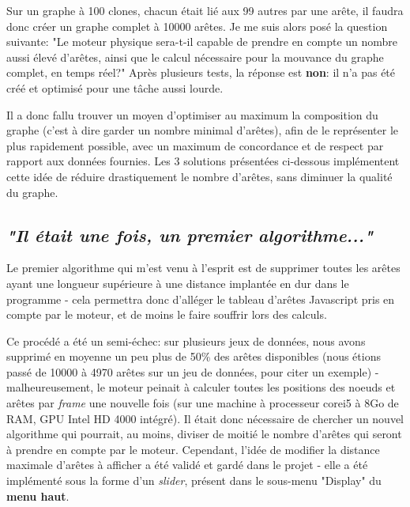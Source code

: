 \documentclass[pdftex,12pt,a4paper]{report}
\begin{document}
\begin{spacing}{1.2}
Sur un graphe à 100 clones, chacun était lié aux 99 autres par une arête, il faudra donc créer un graphe complet à 10000 arêtes. 
Je me suis alors posé la question suivante: "Le moteur physique sera-t-il capable de prendre en compte un nombre aussi élevé d'arêtes, ainsi que le calcul nécessaire pour la mouvance du graphe complet, en temps réel?"
Après plusieurs tests, la réponse est \textbf{non}: il n'a pas été créé et optimisé pour une tâche aussi lourde.

Il a donc fallu trouver un moyen d'optimiser au maximum la composition du graphe (c'est à dire garder un nombre minimal d'arêtes), afin de le représenter le plus rapidement possible, avec un maximum de concordance et de respect par rapport aux données fournies.
Les 3 solutions présentées ci-dessous implémentent cette idée de réduire drastiquement le nombre d'arêtes, sans diminuer la qualité du graphe.

\subsection{\textit{"Il était une fois, un premier algorithme..."}}
Le premier algorithme qui m'est venu à l'esprit est de supprimer toutes les arêtes ayant une longueur supérieure à une distance implantée en dur dans le programme - cela permettra donc d'alléger le tableau d'arêtes Javascript pris en compte par le moteur, et de moins le faire souffrir lors des calculs.

Ce procédé a été un semi-échec: sur plusieurs jeux de données, nous avons supprimé en moyenne un peu plus de 50\% des arêtes disponibles (nous étions passé de 10000 à 4970 arêtes sur un jeu de données, pour citer un exemple) - malheureusement, le moteur peinait à calculer toutes les positions des noeuds et arêtes par \textit{frame} une nouvelle fois (sur une machine à processeur corei5 à 8Go de RAM, GPU Intel HD 4000 intégré).
Il était donc nécessaire de chercher un nouvel algorithme qui pourrait, au moins, diviser de moitié le nombre d'arêtes qui seront à prendre en compte par le moteur. Cependant, l'idée de modifier la distance maximale d'arêtes à afficher a été validé et gardé dans le projet - elle a été implémenté sous la forme d'un \textit{slider}, présent dans le sous-menu "Display" du \textbf{menu haut}.


\end{spacing}
\end{document}
